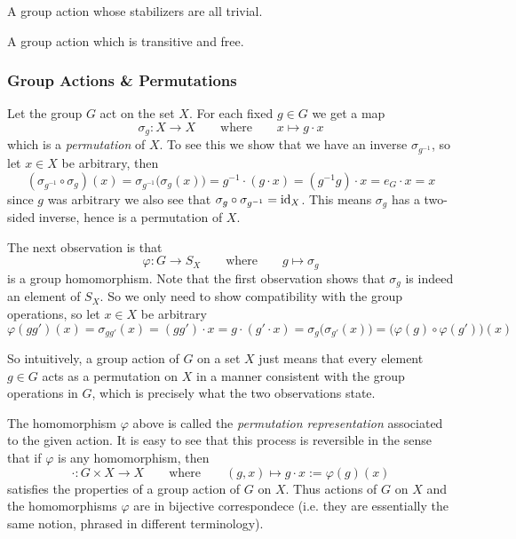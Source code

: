 \begin{definition}
   A group action whose stabilizers are all trivial.
\end{definition}

\begin{definition}
   A group action which is transitive and free.
\end{definition}

\subsubsection{Group Actions \& Permutations}
Let the group \(G\) act on the set \(X\).
For each fixed \(g \in G\) we get a map
\[\sigma_g: X \to X \qquad\text{where}\qquad x \mapsto g \cdot x\]
which is a \emph{permutation} of \(X\).
To see this we show that we have an inverse \(\sigma_{g^{-1}}\), so let \(x \in X\) be arbitrary, then
\[(\sigma_{g^{-1}} \circ \sigma_g)(x) = \sigma_{g^{-1}}\big(\sigma_g(x)\big) = g^{-1} \cdot (g \cdot x) = (g^{-1}g) \cdot x = e_G \cdot x = x\]
since \(g\) was arbitrary we also see that \(\sigma_g \circ \sigma_{g^{-1}} = \operatorname{id}_X\).
This means \(\sigma_g\) has a two-sided inverse, hence is a permutation of \(X\).

The next observation is that
\[\varphi: G \to S_X \qquad\text{where}\qquad g \mapsto \sigma_g\]
is a group homomorphism.
Note that the first observation shows that \(\sigma_g\) is indeed an element of \(S_X\).
So we only need to show compatibility with the group operations, so let \(x \in X\) be arbitrary
\[\varphi(gg')(x) = \sigma_{gg'}(x) = (gg') \cdot x = g \cdot (g' \cdot x) = \sigma_g\big(\sigma_{g'}(x)\big) = \big(\varphi(g) \circ \varphi(g')\big)(x)\]

So intuitively, a group action of \(G\) on a set \(X\) just means that every element \(g \in G\) acts as a permutation on \(X\) in a manner consistent with the group operations in \(G\), which is precisely what the two observations state.

The homomorphism \(\varphi\) above is called the \emph{permutation representation} associated to the given action.
It is easy to see that this process is reversible in the sense that if \(\varphi\) is any homomorphism, then
\[\cdot: G \times X \to X \qquad\text{where}\qquad (g, x) \mapsto g \cdot x := \varphi(g)(x)\]
satisfies the properties of a group action of \(G\) on \(X\).
Thus actions of \(G\) on \(X\) and the homomorphisms \(\varphi\) are in bijective correspondece (i.e. they are essentially the same notion, phrased in different terminology).

